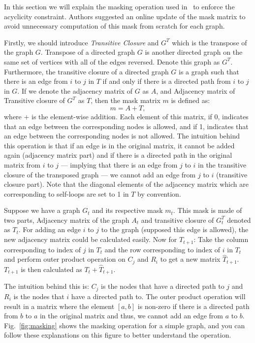 \documentclass{lxaiproposal}
\begin{document}
\begin{table}[h]
        In this section we will explain the masking operation used in~\cite{deleu2022daggflownet} to enforce the acyclicity
        constraint. Authors suggested an online update of the mask matrix to avoid unnecessary computation of this mask
        from scratch for each graph.

        Firstly, we should introduce \textit{Transitive Closure} and $G^T$ which is the transpose of the graph $G$.
        Transpose of a directed graph $G$ is another directed graph on the same set of vertices with all of the edges
        reversed. Denote this graph as $G^T$. Furthermore, the transitive closure of a directed graph $G$ is a graph
        such that there is an edge from $i$ to $j$ in $T$ if and only if there is a directed path from $i$ to $j$ in
        $G$. If we denote the adjacency matrix of $G$ as $A$, and Adjacency matrix of Transitive closure of $G^T$ as $T$,
        then the mask matrix $m$ is defined as:
        \[
            m = A + T,
        \]
        where $+$ is the element-wise addition.
        Each element of this matrix, if 0, indicates that an edge between the corresponding nodes is allowed, and if 1,
        indicates that an edge between the corresponding nodes is not allowed. The intuition behind this operation is
        that if an edge is in the original matrix, it cannot be added again (adjacency matrix part) and if there is a
        directed path in the original matrix from $i$ to $j$ --- implying that there is an edge from $j$ to $i$ in the
        transitive closure of the transposed graph --- we cannot add an edge from $j$ to $i$ (transitive closure part).
        Note that the diagonal elements of the adjacency matrix which are corresponding to self-loops are set to 1 in $T$
        by convention.

        Suppose we have a graph $G_t$ and its respective mask $m_t$. This mask is made of two parts, Adjacency matrix of
        the graph $A_t$ and transitive closure of $G_t^T$ denoted as $T_{t}$. For adding an edge $i$ to $j$ to the
        graph (supposed this edge is allowed), the new adjacency matrix could be calculated easily. Now for $T_{t+1}$:
        Take the column corresponding to index of $j$ in $T_t$ and the row corresponding to index of $i$ in $T_t$ and
        perform outer product operation on $C_j$ and $R_i$ to get a new matrix $\hat{T}_{t+1}$. $T_{t+1}$ is then
        calculated as $T_t + \hat{T}_{t+1}$.

        The intuition behind this is: $C_j$ is the nodes that have a directed path to $j$ and $R_i$ is the nodes that
        $i$ have a directed path to. The outer product operation will result in a matrix where the element $[a, b]$ is
        non-zero if there is a directed path from $b$ to $a$ in the original matrix and thus, we cannot add an edge from
        $a$ to $b$. Fig.~\ref{fig:masking} shows the masking operation for a simple graph, and you can follow these
        explanations on this figure to better understand the operation.


\end{table}
\end{document}
